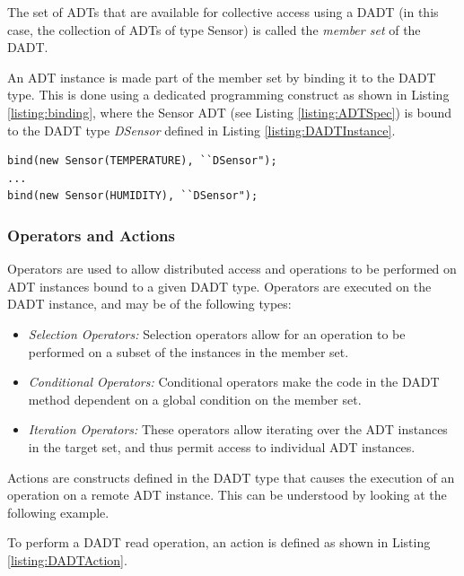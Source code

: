 The set of ADTs that are available for collective access using a DADT (in this
case, the collection of ADTs of type Sensor) is called the \emph{member set} of
the DADT.

An ADT instance is made part of the member set by binding it to the DADT type. This is done using a dedicated
programming construct as shown in Listing \ref{listing:binding}, where the
Sensor ADT (see Listing \ref{listing:ADTSpec}) is bound to the DADT type \emph{DSensor}
defined in Listing \ref{listing:DADTInstance}. 
 
 
\begin{lstlisting}[frame=trbl, basewidth={0.55em, 0.6em}, captionpos=b, 
basicstyle=\ttfamily\footnotesize, breaklines, caption = Binding ADT instances to a DADT instance, label = listing:binding ]
bind(new Sensor(TEMPERATURE), ``DSensor");
...
bind(new Sensor(HUMIDITY), ``DSensor");
\end{lstlisting} 
 

\subsubsection{Operators and Actions} \label{subsubsec:OperatorsAndActions}

Operators are used to allow distributed access and operations to be performed on
ADT instances bound to a given DADT type. Operators are executed on the DADT
instance, and may be of the following types:

\begin{itemize}
  \item \emph{Selection Operators:} Selection operators allow for an operation
  to be performed on a subset of the instances in the member set.
  \item \emph{Conditional Operators:} Conditional operators make the code in the
  DADT method dependent on a global condition on the member set. 
  \item \emph{Iteration Operators:} These operators allow iterating over the ADT
  instances in the target set, and thus permit access to individual ADT instances.
\end{itemize}

Actions are constructs defined in the DADT type that causes the execution of an
operation on a remote ADT instance. This can be understood by looking at the
following example.

To perform a DADT read operation, an action is defined
as shown in Listing
\ref{listing:DADTAction}. 
 
